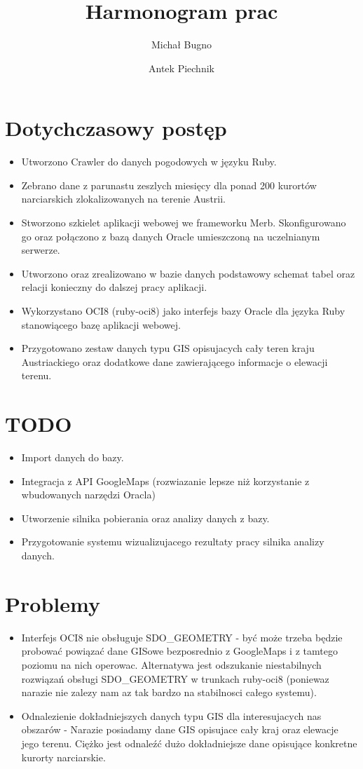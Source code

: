 \documentclass[12pt]{article}
\author{Michał Bugno \and Antek Piechnik}
\title{Harmonogram prac}
\begin{document}
\maketitle

\section{Dotychczasowy postęp}
\begin{itemize}
\item Utworzono Crawler do danych pogodowych w języku Ruby.
\item Zebrano dane z parunastu zeszlych miesięcy dla ponad 200 kurortów narciarskich zlokalizowanych na terenie Austrii.
\item Stworzono szkielet aplikacji webowej we frameworku Merb. 
Skonfigurowano go oraz połączono z bazą danych Oracle umieszczoną na uczelnianym serwerze.
\item Utworzono oraz zrealizowano w bazie danych podstawowy schemat tabel oraz relacji konieczny do dalszej pracy aplikacji.
\item Wykorzystano OCI8 (ruby-oci8) jako interfejs bazy Oracle dla języka Ruby stanowiącego bazę aplikacji webowej.
\item Przygotowano zestaw danych typu GIS opisujacych cały teren kraju Austriackiego oraz dodatkowe dane zawierającego informacje o elewacji terenu.
\end{itemize}

\section{TODO}
\begin{itemize}
\item Import danych do bazy.
\item Integracja z API GoogleMaps (rozwiazanie lepsze niż korzystanie z wbudowanych narzędzi Oracla)
\item Utworzenie silnika pobierania oraz analizy danych z bazy.
\item Przygotowanie systemu wizualizujacego rezultaty pracy silnika analizy danych.
\end{itemize}

\section{Problemy}
\begin{itemize}
\item Interfejs OCI8 nie obsługuje SDO\_GEOMETRY - 
być może trzeba będzie probować powiązać dane GISowe bezposrednio z GoogleMaps i z tamtego poziomu na nich operowac. 
Alternatywa jest odszukanie niestabilnych rozwiązań obsługi SDO\_GEOMETRY w trunkach ruby-oci8 (poniewaz narazie nie zalezy nam az tak bardzo na stabilnosci całego systemu).
\item Odnalezienie dokładniejszych danych typu GIS dla interesujacych nas obszarów - 
Narazie posiadamy dane GIS opisujace cały kraj oraz elewacje jego terenu. Ciężko jest odnaleźć dużo dokładniejsze dane opisujące konkretne kurorty narciarskie.
\end{itemize}
\end{document}
